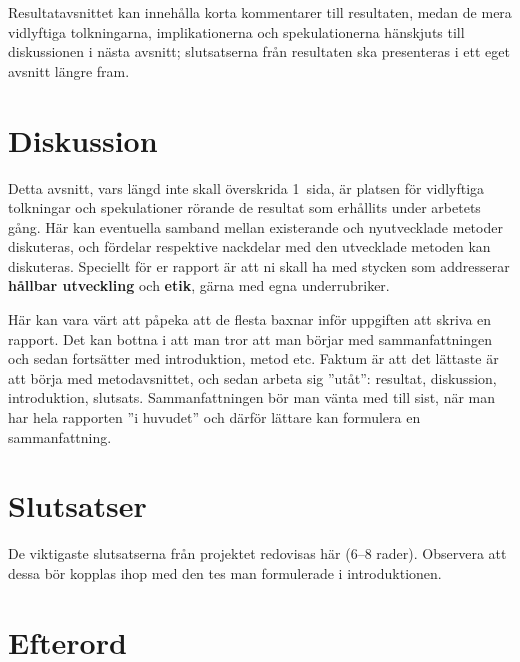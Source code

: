 \documentclass[twoside,twocolumn,9pt,a4paper]{IEEEtran}
\begin{document}
Resultatavsnittet kan innehålla korta kommentarer till resultaten, medan de mera vidlyftiga tolkningarna, implikationerna och spekulationerna hänskjuts till diskussionen i nästa avsnitt; slutsatserna från resultaten ska presenteras i ett eget avsnitt längre fram.





\section{Diskussion}
Detta avsnitt, vars längd inte skall överskrida 1~sida, är platsen för vidlyftiga tolkningar och spekulationer rörande de resultat som erhållits under arbetets gång. Här kan eventuella samband mellan existerande och nyutvecklade metoder diskuteras, och fördelar respektive nackdelar med den utvecklade metoden kan diskuteras. Speciellt för er rapport är att ni skall ha med stycken som addresserar  \textbf{hållbar utveckling} och \textbf{etik}, gärna med egna underrubriker. 

Här kan vara värt att påpeka att de flesta baxnar inför uppgiften att skriva en rapport. Det kan bottna i att man tror att man börjar med sammanfattningen och sedan fortsätter med introduktion, metod etc. Faktum är att det lättaste är att börja med metodavsnittet, och sedan arbeta sig ''utåt'': resultat, diskussion, introduktion, slutsats. Sammanfattningen bör man vänta med till sist, när man har hela rapporten ''i huvudet'' och därför lättare kan formulera en sammanfattning. 


\section{Slutsatser}
De viktigaste slutsatserna från projektet redovisas här (6--8 rader). Observera att dessa bör kopplas ihop med den tes man formulerade i introduktionen.


\section{Efterord}
\end{document}
